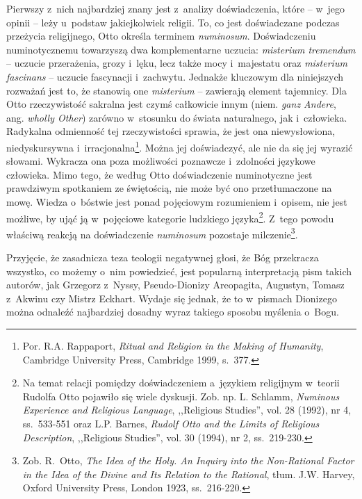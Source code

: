 Pierwszy z~nich najbardziej znany jest z~analizy doświadczenia, które -- w~jego opinii -- leży u~podstaw jakiejkolwiek religii. To, co jest doświadczane podczas przeżycia religijnego, Otto określa terminem \textit{numinosum}. Doświadczeniu numinotycznemu towarzyszą dwa komplementarne uczucia: \textit{misterium tremendum} -- uczucie przerażenia, grozy i~lęku, lecz także mocy i~majestatu oraz \textit{misterium fascinans}\- -- uczucie fascynacji i~zachwytu. Jednakże kluczowym dla niniejszych rozważań jest to, że stanowią one \textit{misterium} -- zawierają element tajemnicy. Dla Otto rzeczywistość sakralna jest czymś całkowicie innym (niem. \textit{ganz Andere}, ang. \textit{wholly Other}) zarówno w~stosunku do świata naturalnego, jak i~człowieka. Radykalna odmienność tej rzeczywistości sprawia, że jest ona niewysłowiona, niedyskursywna i~irracjonalna\footnote{Por. R.A. Rappaport, \textit{Ritual and Religion in the Making of Humanity}, Cambridge University Press, Cambridge 1999, s.~377.}. Można jej doświadczyć, ale nie da się jej wyrazić słowami. Wykracza ona poza możliwości poznawcze i~zdolności językowe człowieka. Mimo tego, że według Otto doświadczenie numinotyczne jest prawdziwym spotkaniem ze świętością, nie może być ono przetłumaczone na mowę. Wiedza o~bóstwie jest ponad pojęciowym rozumieniem i~opisem, nie jest możliwe, by ująć ją w~pojęciowe kategorie ludzkiego języka\footnote{Na temat relacji pomiędzy doświadczeniem a~językiem religijnym w~teorii Rudolfa Otto pojawiło się wiele dyskusji. Zob. np. L. Schlamm, \textit{Numinous Experience and Religious Language}, ,,Religious Studies'', vol. 28 (1992), nr 4, ss.~533-551 oraz L.P. Barnes, \textit{Rudolf Otto and the Limits of Religious Description}, ,,Religious Studies'', vol. 30 (1994), nr 2, ss.~219-230.}. Z~tego powodu właściwą reakcją na doświadczenie \textit{numinosum} pozostaje milczenie\footnote{Zob. R.~Otto, \textit{The Idea of the Holy. An Inquiry into the Non-Rational Factor in the Idea of the Divine and Its Relation to the Rational}, tłum. J.W. Harvey, Oxford University Press, London 1923, ss.~216-220.}.


Przyjęcie, że zasadnicza teza teologii negatywnej głosi, że Bóg przekracza wszystko, co możemy o~nim powiedzieć, jest popularną interpretacją pism takich autorów, jak Grzegorz z~Nyssy, Pseudo-Dionizy Areopagita, Augustyn, Tomasz z~Akwinu czy Mistrz Eck\-hart. Wydaje się jednak, że to w~pismach Dionizego można odnaleźć najbardziej dosadny wyraz takiego sposobu myślenia o~Bogu.


